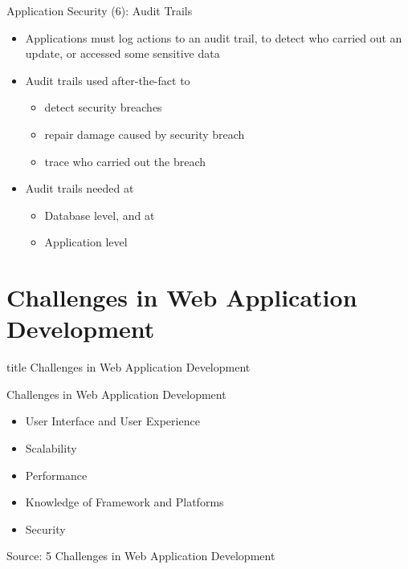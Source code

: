 \documentclass[aspectratio=169, xcolor=dvipsnames]{beamer}
\begin{document}
\begin{frame}{Application Security (6): Audit Trails}
    \begin{itemize}[<+->]
        \item Applications must log actions to an audit trail, to detect who carried out an update, or accessed some sensitive data
        \item Audit trails used after-the-fact to
        \begin{itemize}
            \item[$\triangleright$] detect security breaches
            \item[$\triangleright$] repair damage caused by security breach
            \item[$\triangleright$] trace who carried out the breach
        \end{itemize}
        \item Audit trails needed at
        \begin{itemize}
            \item[$\triangleright$] Database level, and at
            \item[$\triangleright$] Application level
        \end{itemize}
    \end{itemize}
\end{frame}

\section{Challenges in Web Application Development}
\begin{frame}
  \vfill
  \centering
  \begin{beamercolorbox}[sep=8pt,center,shadow=true,rounded=true]{title}
    Challenges in Web Application Development\par%
  \end{beamercolorbox}
  \vfill
\end{frame}

\begin{frame}{Challenges in Web Application Development}
    \begin{itemize}[<+->]
        \item User Interface and User Experience
        \item Scalability
        \item Performance
        \item Knowledge of Framework and Platforms
        \item Security
    \end{itemize}
    \vspace{2em}
    \small Source: 5 Challenges in Web Application Development
\end{frame}
\end{document}
